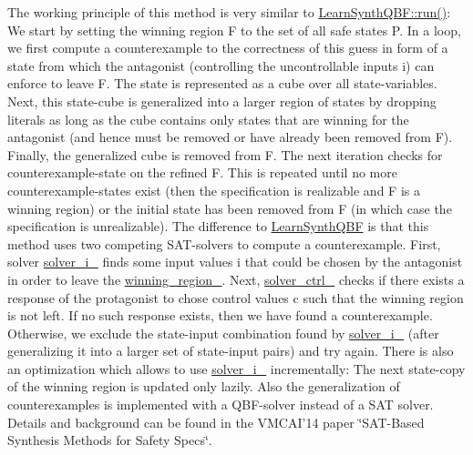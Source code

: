 The working principle of this method is very similar to \hyperlink{classLearnSynthQBF_aed85bb2fe317a5fdc7eef71fe598c606}{Learn\-Synth\-Q\-B\-F\-::run()}\-: We start by setting the winning region F to the set of all safe states P. In a loop, we first compute a counterexample to the correctness of this guess in form of a state from which the antagonist (controlling the uncontrollable inputs i) can enforce to leave F. The state is represented as a cube over all state-\/variables. Next, this state-\/cube is generalized into a larger region of states by dropping literals as long as the cube contains only states that are winning for the antagonist (and hence must be removed or have already been removed from F). Finally, the generalized cube is removed from F. The next iteration checks for counterexample-\/state on the refined F. This is repeated until no more counterexample-\/states exist (then the specification is realizable and F is a winning region) or the initial state has been removed from F (in which case the specification is unrealizable). The difference to \hyperlink{classLearnSynthQBF}{Learn\-Synth\-Q\-B\-F} is that this method uses two competing S\-A\-T-\/solvers to compute a counterexample. First, solver \hyperlink{classLearnSynthSAT_a97e5c03d47cb7f237104472972b12c1c}{solver\-\_\-i\-\_\-} finds some input values i that could be chosen by the antagonist in order to leave the \hyperlink{classLearnSynthSAT_aced2bce789c7a93ed4b5391dd0690616}{winning\-\_\-region\-\_\-}. Next, \hyperlink{classLearnSynthSAT_abb28d64291205442f1df055049ef0195}{solver\-\_\-ctrl\-\_\-} checks if there exists a response of the protagonist to chose control values c such that the winning region is not left. If no such response exists, then we have found a counterexample. Otherwise, we exclude the state-\/input combination found by \hyperlink{classLearnSynthSAT_a97e5c03d47cb7f237104472972b12c1c}{solver\-\_\-i\-\_\-} (after generalizing it into a larger set of state-\/input pairs) and try again. There is also an optimization which allows to use \hyperlink{classLearnSynthSAT_a97e5c03d47cb7f237104472972b12c1c}{solver\-\_\-i\-\_\-} incrementally\-: The next state-\/copy of the winning region is updated only lazily. Also the generalization of counterexamples is implemented with a Q\-B\-F-\/solver instead of a S\-A\-T solver. Details and background can be found in the V\-M\-C\-A\-I'14 paper \char`\"{}\-S\-A\-T-\/\-Based
\-Synthesis Methods for Safety Specs\char`\"{}.

